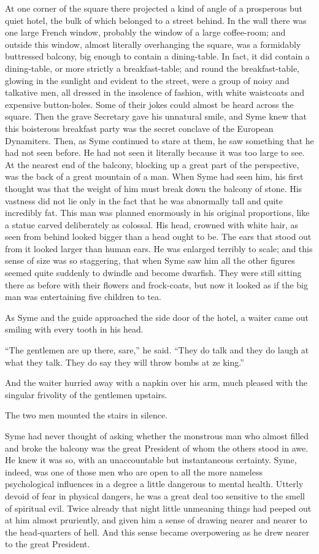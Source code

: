 \documentclass{book}
\begin{document}
At one corner of the square there projected a kind of angle of a prosperous but quiet hotel, the bulk of which belonged to a street behind. In the wall there was one large French window, probably the window of a large coffee-room; and outside this window, almost literally overhanging the square, was a formidably buttressed balcony, big enough to contain a dining-table. In fact, it did contain a dining-table, or more strictly a breakfast-table; and round the breakfast-table, glowing in the sunlight and evident to the street, were a group of noisy and talkative men, all dressed in the insolence of fashion, with white waistcoats and expensive button-holes. Some of their jokes could almost be heard across the square. Then the grave Secretary gave his unnatural smile, and Syme knew that this boisterous breakfast party was the secret conclave of the European Dynamiters. Then, as Syme continued to stare at them, he saw something that he had not seen before. He had not seen it literally because it was too large to see. At the nearest end of the balcony, blocking up a great part of the perspective, was the back of a great mountain of a man. When Syme had seen him, his first thought was that the weight of him must break down the balcony of stone. His vastness did not lie only in the fact that he was abnormally tall and quite incredibly fat. This man was planned enormously in his original proportions, like a statue carved deliberately as colossal. His head, crowned with white hair, as seen from behind looked bigger than a head ought to be. The ears that stood out from it looked larger than human ears. He was enlarged terribly to scale; and this sense of size was so staggering, that when Syme saw him all the other figures seemed quite suddenly to dwindle and become dwarfish. They were still sitting there as before with their flowers and frock-coats, but now it looked as if the big man was entertaining five children to tea.

As Syme and the guide approached the side door of the hotel, a waiter came out smiling with every tooth in his head.

“The gentlemen are up there, sare,” he said. “They do talk and they do laugh at what they talk. They do say they will throw bombs at ze king.”

And the waiter hurried away with a napkin over his arm, much pleased with the singular frivolity of the gentlemen upstairs.

The two men mounted the stairs in silence.

Syme had never thought of asking whether the monstrous man who almost filled and broke the balcony was the great President of whom the others stood in awe. He knew it was so, with an unaccountable but instantaneous certainty. Syme, indeed, was one of those men who are open to all the more nameless psychological influences in a degree a little dangerous to mental health. Utterly devoid of fear in physical dangers, he was a great deal too sensitive to the smell of spiritual evil. Twice already that night little unmeaning things had peeped out at him almost pruriently, and given him a sense of drawing nearer and nearer to the head-quarters of hell. And this sense became overpowering as he drew nearer to the great President.
\end{document}
